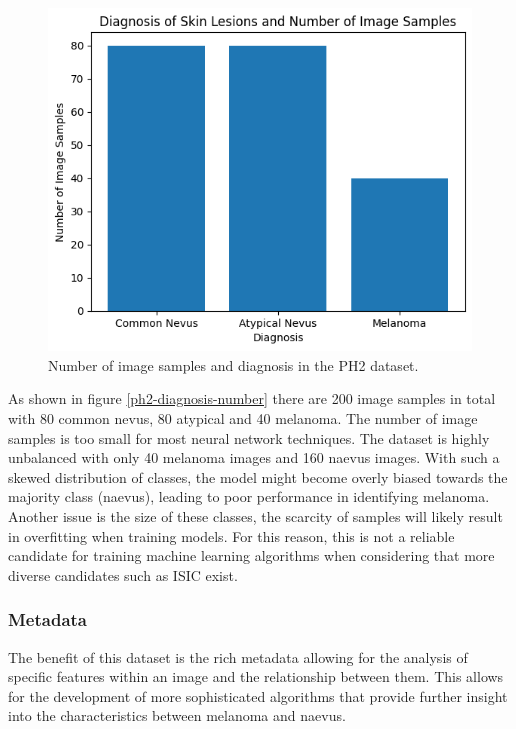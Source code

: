 

\begin{figure}
	\centering
	\includegraphics[scale=0.8]{images/ph2/ph2-diagnosis-number.png}
	\caption{Number of image samples and diagnosis in the PH2 dataset.} 
\end{figure} \label{ph2-diagnosis-number}

As shown in figure \ref{ph2-diagnosis-number} there are 200 image samples in total with 80 common nevus, 80 atypical and 40 melanoma. The number of image samples is too small for most neural network techniques. The dataset is highly unbalanced with only 40 melanoma images and 160 naevus images. With such a skewed distribution of classes, the model might become overly biased towards the majority class (naevus), leading to poor performance in identifying melanoma. Another issue is the size of these classes, the scarcity of samples will likely result in overfitting when training models. For this reason, this is not a reliable candidate for training machine learning algorithms when considering that more diverse candidates such as ISIC exist.

\subsubsection{Metadata}
The benefit of this dataset is the rich metadata allowing for the analysis of specific features within an image and the relationship between them. This allows for the development of more sophisticated algorithms that provide further insight into the characteristics between melanoma and naevus.

